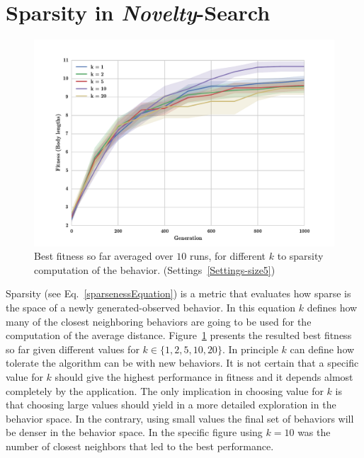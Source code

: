 \section{Sparsity in \emph{Novelty}-Search}


\begin{figure}[b!]
\centering
\includegraphics[width=1.0\textwidth]{../Figures/Results/KnnExperimentSize5.pdf}
\caption{Best fitness so far averaged over $10$ runs, for different $k$ to sparsity computation of the behavior. (Settings~\ref{Settings-size5})}
\label{fig:KnnExperimentSize5}
\end{figure}


Sparsity (see Eq.~\ref{sparsenessEquation}) is a metric that evaluates how sparse is the space of a newly generated-observed behavior. In this equation $k$ defines how many of the closest neighboring behaviors are going to be used for the computation of the average distance. Figure~\ref{fig:KnnExperimentSize5} presents the resulted best fitness so far given different values for $k \in \lbrace 1, 2, 5, 10, 20 \rbrace$. In principle $k$ can define how tolerate the algorithm can be with new behaviors. It is not certain that a specific value for $k$ should give the highest performance in fitness and it depends almost completely by the application. The only implication in choosing value for $k$ is that choosing large values should yield in a more detailed exploration in the behavior space. In the contrary, using small values the final set of behaviors will be denser in the behavior space. In the specific figure using $k=10$ was the number of closest neighbors that led to the best performance.







